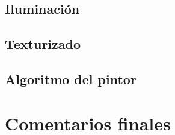 \documentclass[a4paper,12pt]{article}
\begin{document}
\subsection{Iluminación}

\subsection{Texturizado}

\subsection{Algoritmo del pintor} \label{algoritmo_pintor}

\section{Comentarios finales}


\end{document}
